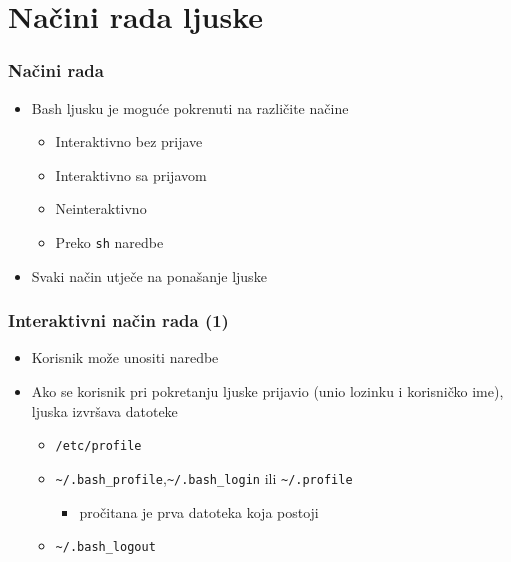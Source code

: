 \documentclass[table,usenames,dvipsnames]{beamer}
\newcommand{\shell}[1]{\texttt{#1}}
\begin{document}
\section{Načini rada ljuske}
\begin{frame}[t]
\frametitle{Načini rada}
\begin{itemize}
  \item Bash ljusku je moguće pokrenuti na različite načine
  \begin{itemize}
    \item Interaktivno bez prijave
    \item Interaktivno sa prijavom
    \item Neinteraktivno
    \item Preko \shell{sh} naredbe
  \end{itemize}
  \item Svaki način utječe na ponašanje ljuske
\end{itemize}
\end{frame}

\begin{frame}[t]
\frametitle{Interaktivni način rada (1)}
\begin{itemize}
  \item Korisnik može unositi naredbe
  \item Ako se korisnik pri pokretanju ljuske prijavio (unio lozinku i 
        korisničko ime), ljuska izvršava datoteke
  \begin{itemize}
    \item \shell{/etc/profile}
    \item \shell{\~{}/.bash\_profile},\shell{\~{}/.bash\_login} ili 
          \shell{\~{}/.profile}
    \begin{itemize}
      \item pročitana je prva datoteka koja postoji
    \end{itemize}
    \item \shell{\~{}/.bash\_logout}
  \end{itemize}
\end{itemize}
\end{frame}
\end{document}
